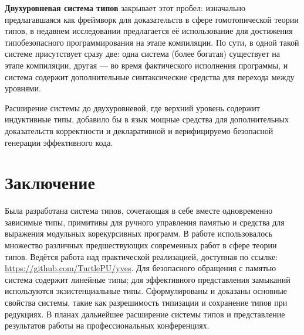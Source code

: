 \documentclass[12pt]{article}
\begin{document}
\textbf{Двухуровневая система типов} закрывает этот пробел: изначально
предлагавшаяся как фреймворк для доказательств в сфере гомотопической теории
типов, в недавнем исследовании \cite{staged} предлагается её использование для
достижения типобезопасного программирования на этапе компиляции. По сути, в
одной такой системе присутствует сразу две: одна система (более богатая)
существует на этапе компиляции, другая --- во время фактического исполнения
программы, и система содержит дополнительные синтаксические средства для
перехода между уровнями.

Расширение системы до двухуровневой, где верхний уровень содержит индуктивные
типы, добавило бы в язык мощные средства для дополнительных доказательств
корректности и декларативной и верифицируемо безопасной генерации эффективного
кода.

\section{Заключение}

Была разработана система типов, сочетающая в себе вместе одновременно зависимые
типы, примитивы для ручного управления памятью и средства для выражения
модульных корекурсивных программ. В работе использовалось множество различных
предшествующих современных работ в сфере теории типов. Ведётся работа над
практической реализацией, доступная по ссылке:
\url{https://github.com/TurtlePU/yves}. Для безопасного обращения с памятью
система содержит линейные типы; для эффективного представления замыканий
используются экзистенциальные типы. Сформулированы и доказаны основные свойства
системы, такие как разрешимость типизации и сохранение типов при редукциях.
В планах дальнейшее расширение системы типов и представление результатов работы
на профессиональных конференциях.

\printbibliography
\end{document}
